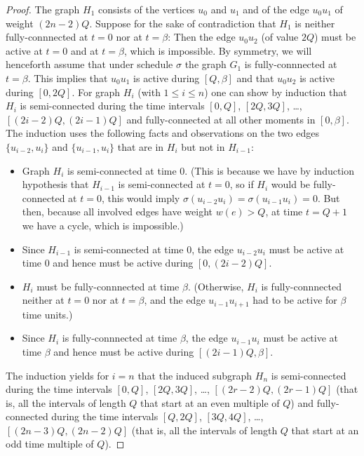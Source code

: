 \documentclass[runningheads]{llncs}
\numberwithin{equation}{section}
\newcommand{\set}[1]{\{ #1 \}}
\begin{document}
\begin{proof}
The graph $H_1$ consists of the vertices $u_0$ and $u_1$ and of the edge $u_0 u_1$ of weight $(2n-2)Q$.
Suppose for the sake of contradiction that $H_1$ is neither fully-connnected at $t=0$ nor at $t=\beta$:
Then the edge $u_0 u_2$ (of value $2Q$) must be active at $t=0$ and at $t=\beta$, which is impossible.
By symmetry, we will henceforth assume that under schedule $\sigma$ the graph $G_1$ is fully-connnected at $t=\beta$.
This implies that $u_0 u_1$ is active during $[Q,\beta]$ and that $u_0 u_2$ is active during $[0,2Q]$.
For graph $H_i$ (with $1\le i\le n$) one can show by induction that $H_i$ is semi-connected
during the time intervals $[0,Q]$, $[2Q,3Q]$, \dots, $[(2i-2)Q,(2i-1)Q]$ and fully-connected at all
other moments in $[0,\beta]$.
The induction uses the following facts and observations on the two edges $\set{u_{i-2}, u_i}$ and $\set{u_{i-1},u_i}$ 
that are in $H_i$ but not in $H_{i-1}$:
\begin{itemize}
\item Graph $H_i$ is semi-connected at time $0$. (This is because we have by induction hypothesis that $H_{i-1}$ is semi-connected at $t=0$, so if $H_i$ would be fully-connected at $t=0$, this would imply $\sigma(u_{i-2}u_i) = \sigma(u_{i-1}u_i) = 0$. But then, because all involved edges have weight $w(e) > Q$, at time $t = Q+1$ we have a cycle, which is impossible.)
\item Since $H_{i-1}$ is semi-connected at time $0$, the edge $u_{i-2}u_i$ must be active at time $0$
and hence must be active during $[0,(2i-2)Q]$.
\item $H_i$ must be fully-connnected at time $\beta$. (Otherwise, $H_i$ is fully-connnected neither 
at $t=0$ nor at $t=\beta$, and the edge $u_{i-1}u_{i+1}$ had to be active for $\beta$ time units.)
\item Since $H_i$ is fully-connnected at time $\beta$, the edge $u_{i-1}u_i$ must be active at time $\beta$
and hence must be active during $[(2i-1)Q,\beta]$.
\end{itemize}
The induction yields for $i=n$ that the induced subgraph $H_n$ is semi-connected during the time intervals 
$[0,Q]$, $[2Q,3Q]$, \dots, $[(2r-2)Q,(2r-1)Q]$ (that is, all the intervals of length $Q$ that start at an even multiple of $Q$)
and fully-connected during the time intervals $[Q,2Q]$, $[3Q,4Q]$, \dots, $[(2n-3)Q,(2n-2)Q]$ (that is, all the 
intervals of length $Q$ that start at an odd time multiple of $Q$).


\end{proof}
\end{document}
